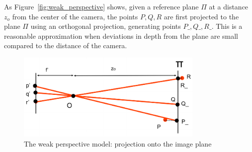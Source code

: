\documentclass[a4paper, 12pt]{article}
\begin{document}
As Figure~\ref{fig:weak_perspective} shows, given a reference plane $\Pi$ at a distance $z_o$ from the center of the camera, the points $P,Q,R$ are first projected to the plane $\Pi$ using an orthogonal projection, generating points $P\_, Q\_, R\_$.  This is a reasonable approximation when deviations in depth from the plane are small compared to the distance of the camera. 

\begin{figure}[h!]
\centering
\includegraphics[width=0.8\textwidth]{figures/weak_perspective2.png}
\caption{The weak perspective model: projection onto the image plane}
\label{fig:weak_perspective2}
\end{figure}
\end{document}
